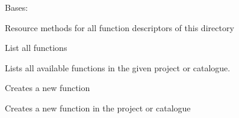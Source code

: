 \documentclass[letterpaper,10pt,english]{sphinxmanual}
\begin{document}

\begin{fulllineitems}
\label{_source/son_editor.apis:son_editor.apis.project_functionsapi.Functions}
Bases: 

Resource methods for all function descriptors of this directory

\begin{fulllineitems}
\label{_source/son_editor.apis:son_editor.apis.project_functionsapi.Functions.get}
List all functions

Lists all available functions in the given project or catalogue.

\end{fulllineitems}


\begin{fulllineitems}
\label{_source/son_editor.apis:son_editor.apis.project_functionsapi.Functions.methods}
\end{fulllineitems}


\begin{fulllineitems}
\label{_source/son_editor.apis:son_editor.apis.project_functionsapi.Functions.post}
Creates a new function

Creates a new function in the project or catalogue

\end{fulllineitems}


\end{fulllineitems}

\end{document}
